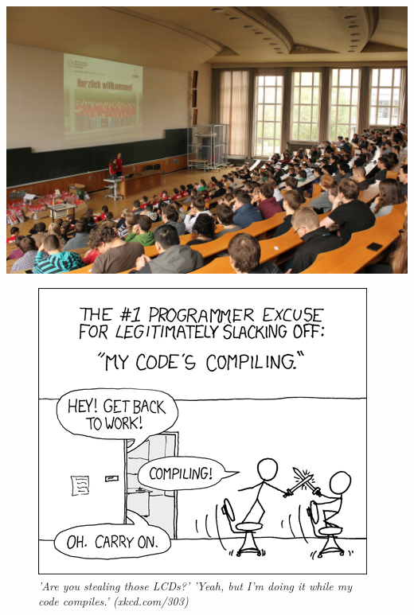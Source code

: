 \vfill

\includegraphics[width=\linewidth]{img/ese2013/barschoe.jpg}

\vfill

\begin{figure}[h!]
\centering
\includegraphics[scale=.5]{img/xkcd/compiling.png}
\caption*{{\small \textit{'Are you stealing those LCDs?' 'Yeah, but I'm doing it while my code compiles.' (xkcd.com/303)}}}
\end{figure}
